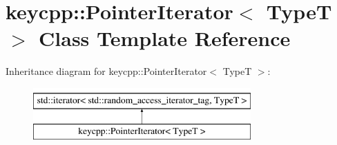 \hypertarget{classkeycpp_1_1_pointer_iterator}{\section{keycpp\-:\-:Pointer\-Iterator$<$ Type\-T $>$ Class Template Reference}
\label{classkeycpp_1_1_pointer_iterator}
}
Inheritance diagram for keycpp\-:\-:Pointer\-Iterator$<$ Type\-T $>$\-:\begin{figure}[H]
\begin{center}
\leavevmode
\includegraphics[height=2.000000cm]{classkeycpp_1_1_pointer_iterator}
\end{center}
\end{figure}
